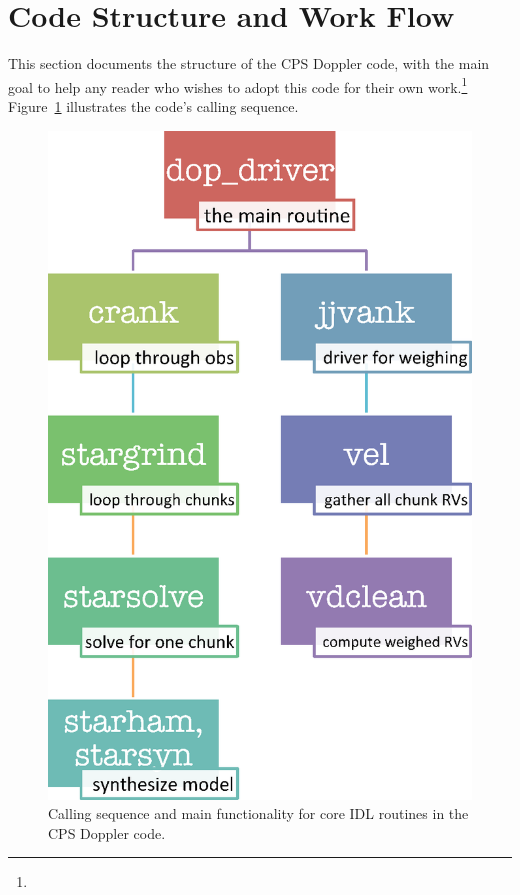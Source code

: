 \section{Code Structure and Work Flow}

This section documents the structure of the CPS Doppler code, with the
main goal to help any reader who wishes to adopt this code for their
own work.\footnote{}
Figure~\ref{doppler:fig:flowchart} illustrates the code's calling
sequence.


\begin{figure}
  \centering
\includegraphics[scale=0.6]{doppler/flowchart.eps}
\caption{Calling sequence and main functionality for core IDL
  routines in the CPS Doppler code. \label{doppler:fig:flowchart}}
\end{figure}


